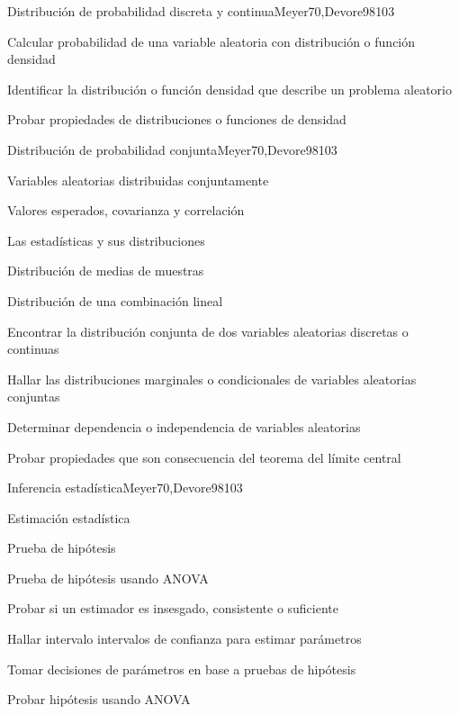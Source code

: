 \begin{syllabus}
\begin{unit}{Distribución de probabilidad discreta y continua}{Meyer70,Devore98}{10}{3}
   \begin{learningoutcomes}
      \item Calcular probabilidad de una variable aleatoria con distribución o función densidad
      \item Identificar la distribución o función densidad que describe un problema aleatorio
      \item Probar propiedades de distribuciones o funciones de densidad
   \end{learningoutcomes}
\end{unit}

\begin{unit}{Distribución de probabilidad conjunta}{Meyer70,Devore98}{10}{3}
\begin{topics}
      \item Variables aleatorias distribuidas conjuntamente
      \item Valores esperados, covarianza y correlación
      \item Las estadísticas y sus distribuciones
      \item Distribución de medias de muestras
      \item Distribución de una combinación lineal

   \end{topics}
   \begin{learningoutcomes}
      \item Encontrar la distribución conjunta de dos variables aleatorias discretas o continuas
      \item Hallar las distribuciones marginales o condicionales de variables aleatorias conjuntas
      \item Determinar dependencia o independencia de variables aleatorias
      \item Probar propiedades que son consecuencia del teorema  del límite central
   \end{learningoutcomes}
\end{unit}

\begin{unit}{Inferencia estadística}{Meyer70,Devore98}{10}{3}
\begin{topics}
      \item Estimación estadística
      \item Prueba de hipótesis
      \item Prueba de hipótesis usando ANOVA
   \end{topics}

   \begin{learningoutcomes}
      \item Probar si un estimador es insesgado, consistente o suficiente
      \item Hallar intervalo intervalos de confianza para estimar parámetros
      \item Tomar decisiones de parámetros en base a pruebas de hipótesis
      \item Probar hipótesis usando ANOVA
   \end{learningoutcomes}
\end{unit}




\end{syllabus}
